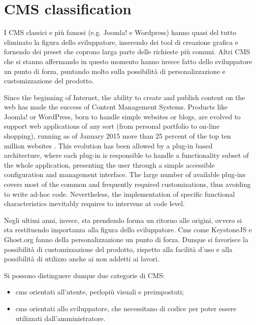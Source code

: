 \section{CMS classification}
\label{sec:CMS_class}

I CMS classici e più famosi (e.g. Joomla! e Wordpress) hanno quasi del tutto eliminato la figura dello sviluppatore, inserendo dei tool di creazione grafica e fornendo dei preset che coprono larga parte delle richieste più comuni. Altri CMS che si stanno affermando in questo momento hanno invece fatto dello sviluppatore un punto di forza, puntando molto sulla possibilità di personalizzazione e customizzazione del prodotto.

Since the beginning of Internet, the ability to create and publish content on the web has made the success of Content Management Systems. Products like Joomla! or WordPress, born to handle simple websites or blogs, are evolved to support web applications of any sort (from personal portfolio to on-line shopping), running as of January 2015 more than 25 percent of the top ten million websites \cite{cms_stats}. This evolution has been allowed by a plug-in based architecture, where each plug-in is responsible to handle a functionality subset of the whole application, presenting the user through a simple accessible configuration and management interface.
The large number of available plug-ins covers most of the common and frequently required customizations, thus avoiding to write ad-hoc code. Nevertheless, the implementation of specific functional characteristics inevitably requires to intervene at code level.

Negli ultimi anni, invece, sta prendendo forma un ritorno alle origini, ovvero si sta restituendo importanza alla figura dello sviluppatore. Cms come KeystoneJS e Ghost.org fanno della personalizzazione un punto di forza.
Dunque si favorisce la possibilità di customizzazione del prodotto, rispetto alla facilità d'uso e alla possibilità di utilizzo anche ai non addetti ai lavori. 

Si possono distinguere dunque due categorie di CMS:
\begin{itemize}

\item cms orientati all'utente, perlopiù visuali e preimpostati;
\item cms orientati allo sviluppatore, che necessitano di codice per poter essere utilizzati dall'amministratore.

\end{itemize}